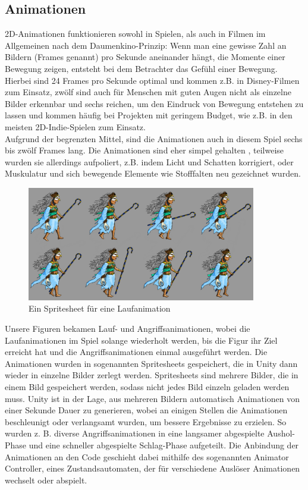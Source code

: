 \documentclass[extern,palatino]{cgBA}
\begin{document}
\subsection{Animationen}\label{ani}
2D-Animationen funktionieren sowohl in Spielen, als auch in Filmen im Allgemeinen nach dem Daumenkino-Prinzip: Wenn man eine gewisse Zahl an Bildern (Frames genannt) pro Sekunde aneinander hängt, die Momente einer Bewegung zeigen, entsteht bei dem Betrachter das Gefühl einer Bewegung. Hierbei sind 24 Frames pro Sekunde optimal und kommen z.B. in Disney-Filmen zum Einsatz, zwölf sind auch für Menschen mit guten Augen nicht als einzelne Bilder erkennbar und sechs reichen, um den Eindruck von Bewegung entstehen zu lassen und kommen häufig bei Projekten mit geringem Budget, wie z.B. in den meisten 2D-Indie-Spielen zum Einsatz. %
\\Aufgrund der begrenzten Mittel, sind die Animationen auch in diesem Spiel sechs bis zwölf Frames lang. Die Animationen sind eher simpel gehalten%
, teilweise wurden sie allerdings aufpoliert, z.B. indem Licht und Schatten korrigiert, oder Muskulatur und sich bewegende Elemente wie Stofffalten neu gezeichnet wurden.\\
\begin{figure}[H]
	\centering
	\includegraphics[height=5cm]{move.jpg}
	\caption{Ein Spritesheet für eine Laufanimation}
\end{figure}
Unsere Figuren bekamen Lauf- und Angriffsanimationen, wobei die Laufanimationen im Spiel solange wiederholt werden, bis die Figur ihr Ziel erreicht hat und die Angriffsanimationen einmal ausgeführt werden. Die Animationen wurden in sogenannten Spritesheets gespeichert, die in Unity dann wieder in einzelne Bilder zerlegt werden. Spritesheets sind mehrere Bilder, die in einem Bild gespeichert werden, sodass nicht jedes Bild einzeln geladen werden muss. Unity ist in der Lage, aus mehreren Bildern automatisch Animationen von einer Sekunde Dauer zu generieren, wobei an einigen Stellen die Animationen beschleunigt oder verlangsamt wurden, um bessere Ergebnisse zu erzielen. So wurden z. B. diverse Angriffsanimationen in eine langsamer abgespielte Aushol-Phase und eine schneller abgespielte Schlag-Phase aufgeteilt. Die Anbindung der Animationen an den Code geschieht dabei mithilfe des sogenannten Animator Controller, eines Zustandsautomaten, der für verschiedene Auslöser Animationen wechselt oder abspielt.
\end{document}
